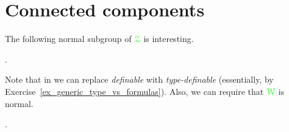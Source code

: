 \begin{comment}
\begin{proof}
  Assume inductively that $\mrD\cap{\gr g'}{\cdot}\mrD$ is $H$-wide, where ${\gr g'}\in\<\,({\gr g})_{K}^2\>$.
  Pick two arbitrary ${\gr a},{\gr b}\in({\gr g})_K$.
  We claim that $\mrD\cap{\gr a}{\cdot}{\gr b}{\cdot}{\gr g'}{\cdot}\mrD$ is $H$-wide.
  From the induction hypothesis it follows that ${\gr b}{\cdot}\mrD\cap{\gr b}{\cdot}{\gr g'}{\cdot}\mrD$ is $H$-wide.
  By Fact~\ref{prop_wideHcojugate_symm}, ${\gr a^{-1}}{\cdot}\mrD\cap{\gr b}{\cdot}{\gr g'}{\cdot}\mrD$ is $H$-wide and the claim follows.
\end{proof}
\end{comment}

\section{Connected components}

The following normal subgroup of ${\color{green}\EuScript Z}$ is interesting.

\begin{definition}\label{def_G0}\noindent\vspace*{0.1ex}

  .\smallskip

\end{definition}

Note that in  we can replace \textit{definable\/} with \textit{type-definable\/} (essentially, by Exercise~\ref{ex_generic_type_vs_formulas}).
Also, we can require that ${\color{green}\EuScript W}$ is normal.


\begin{fact}\noindent\vspace*{0.1ex}
  
  .\smallskip


\end{fact}

